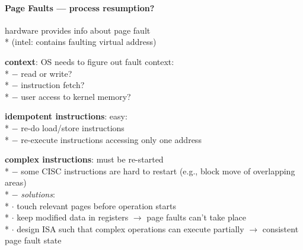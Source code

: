 \paragraph{Page Faults --- process resumption?}
\begin{items}
  \item hardware provides info about page fault \\*
    (intel:  contains faulting virtual address)
  \item \textbf{context}: OS needs to figure out fault context: \\*
    $ - $ read or write? \\*
    $ - $ instruction fetch? \\*
    $ - $ user access to kernel memory?
  \item \textbf{idempotent instructions}: easy: \\*
    $ - $ re-do load/store instructions \\*
    $ - $ re-execute instructions accessing only one address
  \item \textbf{complex instructions}: must be re-started \\*
    $ - $ some CISC instructions are hard to restart (e.g., block move of overlapping areas) \\*
    $ - $ \emph{solutions}: \\*
      \phantom{$ - $} $ \cdot $ touch relevant pages before operation starts \\*
      \phantom{$ - $} $ \cdot $ keep modified data in registers $ \to $ page faults can't take place \\*
      \phantom{$ - $} $ \cdot $ design ISA such that complex operations can execute partially $ \to $ consistent page fault state
\end{items}